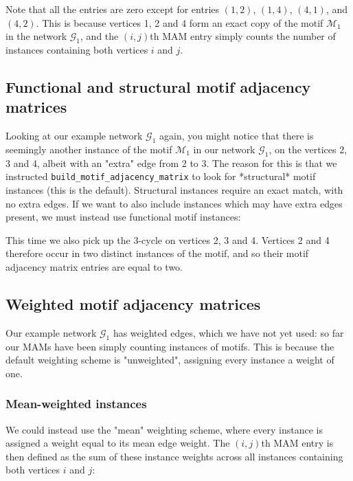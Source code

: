 \documentclass{article}
\begin{document}
Note that all the entries are zero except for entries
$(1,2)$,
$(1,4)$,
$(4,1)$,
and
$(4,2)$.
This is because vertices 1, 2 and 4 form an exact copy of
the motif $\mathcal{M}_1$ in the network $\mathcal{G}_1$,
and the  $(i,j)$th MAM entry simply counts the number of instances
containing both vertices $i$ and $j$.

\subsection{Functional and structural motif adjacency matrices}

Looking at our example network $\mathcal{G}_1$ again,
you might notice that there is seemingly another instance
of the motif $\mathcal{M}_1$
in our network $\mathcal{G}_1$,
on the vertices 2, 3 and 4,
albeit with an "extra" edge from 2 to 3.
The reason for this is that we instructed
\texttt{build\_motif\_adjacency\_matrix}
to look for *structural* motif instances (this is the default).
Structural instances require an exact match, with no extra edges.
If we want to also include instances which may have extra edges present,
we must instead use functional motif instances:


\begin{pyconsole}
\end{pyconsole}

This time we also pick up the 3-cycle on vertices 2, 3 and 4.
Vertices 2 and 4 therefore occur in two distinct instances
of the motif, and so their motif adjacency matrix entries are equal
to two.

\subsection{Weighted motif adjacency matrices}

Our example network $\mathcal{G}_1$ has weighted edges,
which we have not yet used:
so far our MAMs have been simply counting
instances of motifs.
This is because the default weighting scheme is
"unweighted", assigning every instance a weight of one.

\subsubsection{Mean-weighted instances}

We could instead use the "mean" weighting scheme,
where every instance is assigned a weight equal to its
mean edge weight.
The $(i,j)$th MAM entry is then defined as the sum of these
instance weights across all instances containing
both vertices $i$ and $j$:
\end{document}
